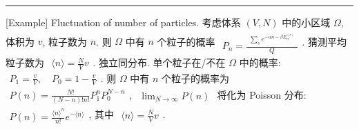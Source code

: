 \documentclass[../../main.tex]{subfiles}
\begin{document}
\vspace{0.5em}\hrule\vspace{0.5em}
[Example] Fluctuation of number of particles. 考虑体系 $(V,N)$ 中的小区域 $\Omega$, 体积为 $v$, 粒子数为 $n$. 则 $\Omega$ 中有 $n$ 个粒子的概率 $\begin{aligned} 
    P_{n} = \frac{\begin{aligned}
        \sum_{s}e^{-\alpha n - \beta E_{n}^{(s)}}
    \end{aligned}}{Q}
\end{aligned}$. 猜测平均粒子数为 $\begin{aligned}
    \langle n\rangle = \frac{N}{V}v
\end{aligned}$. 独立同分布. 单个粒子在/不在 $\Omega$ 中的概率: $\begin{aligned}
    P_{1} = \frac{v}{V}, \quad P_{0} = 1 - \frac{v}{V}
\end{aligned}$. 则 $\Omega$ 中有 $n$ 个粒子的概率为 $\begin{aligned}
    P(n) = \frac{N!}{(N-n)!n!}P_{1}^{n}P_{0}^{N-n}
\end{aligned}$, $\begin{aligned}
    \lim_{N\rightarrow\infty}P(n)
\end{aligned}$ 将化为 Poisson 分布: $\begin{aligned}
    P(n) = \frac{\langle n\rangle^{n}}{n!}e^{-\langle n\rangle}
\end{aligned}$, 其中 $\begin{aligned}
    \langle n\rangle = \frac{N}{V}v
\end{aligned}$.
\end{document}
